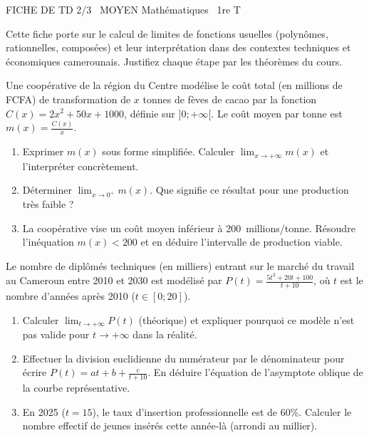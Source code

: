 \documentclass[11pt]{article}
\begin{document}
\begin{tcolorbox}[enhanced,colback=popink,colframe=popink,arc=10pt,boxrule=0pt,left=12pt,right=12pt,top=9pt,bottom=9pt]
{\color{white}\popxbold\small FICHE DE TD 2/3 \textbullet\ MOYEN \hfill Mathématiques \textbullet\ 1re T\par}
\end{tcolorbox}
\vspace{4pt}
\noindent Cette fiche porte sur le calcul de limites de fonctions usuelles (polynômes, rationnelles, composées) et leur interprétation dans des contextes techniques et économiques camerounais. Justifiez chaque étape par les théorèmes du cours.

\begin{exercice}
Une coopérative de la région du Centre modélise le coût total (en millions de FCFA) de transformation de $x$ tonnes de fèves de cacao par la fonction $C(x) = 2x^2 + 50x + 1000$, définie sur $]0; +\infty[$. Le coût moyen par tonne est $m(x) = \frac{C(x)}{x}$.
\begin{enumerate}
    \item Exprimer $m(x)$ sous forme simplifiée. Calculer $\lim_{x \to +\infty} m(x)$ et l'interpréter concrètement.
    \item Déterminer $\lim_{x \to 0^+} m(x)$. Que signifie ce résultat pour une production très faible ?
    \item La coopérative vise un coût moyen inférieur à \SI{200}{millions/tonne}. Résoudre l'inéquation $m(x) < 200$ et en déduire l'intervalle de production viable.
\end{enumerate}
\end{exercice}

\begin{exercice}
Le nombre de diplômés techniques (en milliers) entrant sur le marché du travail au Cameroun entre 2010 et 2030 est modélisé par $P(t) = \frac{5t^2 + 20t + 100}{t + 10}$, où $t$ est le nombre d'années après 2010 ($t \in [0; 20]$).
\begin{enumerate}
    \item Calculer $\lim_{t \to +\infty} P(t)$ (théorique) et expliquer pourquoi ce modèle n'est pas valide pour $t \to +\infty$ dans la réalité.
    \item Effectuer la division euclidienne du numérateur par le dénominateur pour écrire $P(t) = at + b + \frac{c}{t+10}$. En déduire l'équation de l'asymptote oblique de la courbe représentative.
    \item En 2025 ($t=15$), le taux d'insertion professionnelle est de $60\%$. Calculer le nombre effectif de jeunes insérés cette année-là (arrondi au millier).
\end{enumerate}
\end{exercice}
\end{document}
